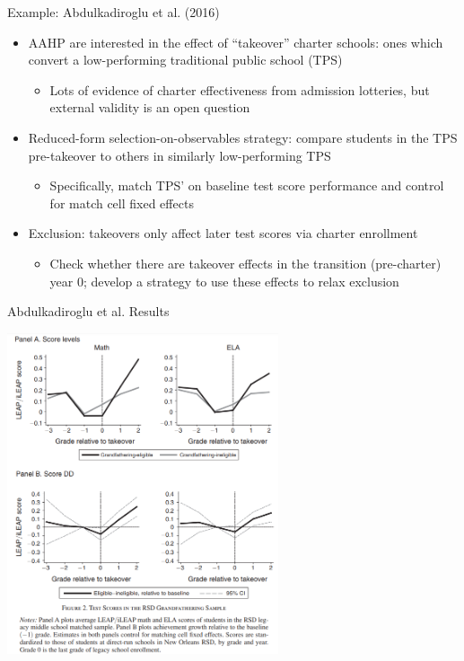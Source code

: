 \documentclass[11pt,english]{beamer}
\begin{document}
\begin{frame}{Example: Abdulkadiroglu et al. (2016)}

\begin{itemize}
\item AAHP are interested in the effect of ``takeover'' charter schools: ones which convert a low-performing traditional public school (TPS)\smallskip
\begin{itemize}
\item Lots of evidence of charter effectiveness from admission lotteries, but external validity is an open question
\end{itemize}\bigskip\pause{}

\item Reduced-form selection-on-observables strategy: compare students in the TPS pre-takeover to others in similarly low-performing TPS\smallskip
\begin{itemize}
\item Specifically, match TPS' on baseline test score performance and control for match cell fixed effects 
\end{itemize}\bigskip\pause{}

\item Exclusion: takeovers only affect later test scores via charter enrollment\smallskip
\begin{itemize}
\item Check whether there are takeover effects in the transition (pre-charter) year 0; develop a strategy to use these effects to relax exclusion
\end{itemize}
\end{itemize}

\end{frame}

\begin{frame}{ Abdulkadiroglu et al. Results}
\begin{center}
	\includegraphics[width=0.6\textwidth]{figures/aahp.png}
\end{center}
\end{frame}
\end{document}
